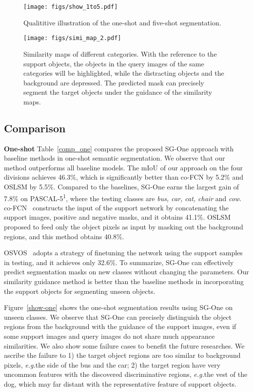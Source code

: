 \documentclass[journal]{IEEEtran}
\newcommand{\eg}{\emph{e.g.}}
\begin{document}
\begin{figure}
  \centering
  \texttt{[image: figs/show\_1to5.pdf]}
  \caption{Qualititive illustration of the one-shot and five-shot segmentation.}\label{show-1to5}
  \vspace{-12pt}
\end{figure}

\begin{figure*}
  \centering
  \texttt{[image: figs/simi\_map\_2.pdf]}
  \caption{Similarity maps of different categories. With the reference to the support objects, the objects in the query images of the same categories will be highlighted, while the distracting objects and the background are depressed. The predicted mask can precisely segment the target objects under the guidance of the similarity maps.}\label{simi_map}
  \vspace{-12pt}
\end{figure*}


\subsection{Comparison}
\noindent \textbf{One-shot}
Table~\ref{comp_one} compares the proposed SG-One approach with baseline methods in one-shot semantic segmentation. 
We observe that our method outperforms all baseline models.
The mIoU of our approach on the four divisions achieves 46.3\%, which is significantly better than co-FCN by 5.2\% and OSLSM by 5.5\%.
Compared to the baselines, SG-One earns the largest gain of 7.8\% on PASCAL-5\textsuperscript{1}, where the testing classes are \textit{bus, car, cat, chair} and \textit{cow}.
co-FCN~\cite{rakelly2018conditional} constructs the input of the support network by concatenating the support images, positive and negative masks, and it obtains 41.1\%.
OSLSM~\cite{shaban2017one} proposed to feed only the object pixels as input by masking out the background regions, and this method obtains 40.8\%. 

OSVOS~\cite{caelles2017one} adopts a strategy of finetuning the network using the support samples in testing, and it achieves only 32.6\%.
To summarize, SG-One can effectively predict segmentation masks on new classes without changing the parameters.
Our similarity guidance method is better than the baseline methods in incorporating the support objects for segmenting unseen objects.

Figure~\ref{show-one} shows the one-shot segmentation results using SG-One on unseen classes.
We observe that SG-One can precisely distinguish the object regions from the background with the guidance of the support images, even if some support images and query images do not share much appearance similarities.
We also show some failure cases to benefit the future researches.
We ascribe the failure to 1) the target object regions are too similar to background pixels, \eg the side of the bus and the car; 
2) the target region have very uncommon features with the discovered discriminative regions, \eg the vest of the dog, which may far distant with the representative feature of support objects.
\end{document}
